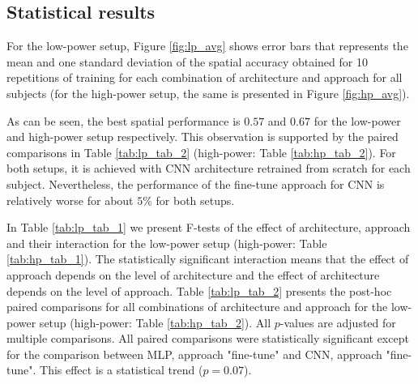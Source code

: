 \subsection{Statistical results}

For the low-power setup, Figure \ref{fig:lp_avg} shows error bars that represents the mean and one standard deviation of the spatial accuracy obtained for 10 repetitions of training for each combination of architecture and approach for all subjects (for the high-power setup, the same is presented in Figure \ref{fig:hp_avg}).

As can be seen, the best spatial performance is $0.57$\textdegree{} and $0.67$\textdegree{} for the low-power and high-power setup respectively. This observation is supported by the paired comparisons in Table \ref{tab:lp_tab_2} (high-power: Table \ref{tab:hp_tab_2}). For both setups, it is achieved with CNN architecture retrained from scratch for each subject. Nevertheless, the performance of the fine-tune approach for CNN is relatively worse for about $5$\% for both setups.

In Table \ref{tab:lp_tab_1} we present F-tests of the effect of architecture, approach and their interaction for the low-power setup (high-power: Table \ref{tab:hp_tab_1}). The statistically significant interaction means that the effect of approach depends on the level of architecture and the effect of architecture depends on the level of approach. Table \ref{tab:lp_tab_2} presents the post-hoc paired comparisons for all combinations of architecture and approach for the low-power setup (high-power: Table \ref{tab:hp_tab_2}).  All $p$-values are adjusted for multiple comparisons.  All paired comparisons were statistically significant except for the comparison between MLP, approach "fine-tune" and CNN, approach "fine-tune". This effect is a statistical trend ($p = 0.07$). 


